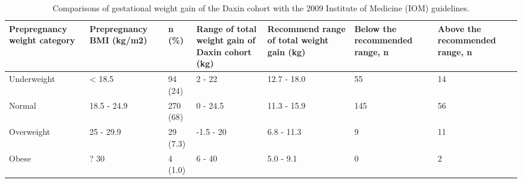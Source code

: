 \begin{table}[htp]
\tiny
\caption[Comparisons of gestational weight gain of the Daxin cohort with the 2009 Institute of Medicine (IOM) guidelines]{Comparisons of gestational weight gain of the Daxin cohort with the 2009 Institute of Medicine (IOM) guidelines.}
\begin{center}
\begin{tabular}{|p{2.1cm}|p{1.8cm}|p{1.2cm}|p{1.5cm}|p{1.6cm}|p{1.8cm}|p{1.8cm}|}
\hline
Prepregnancy weight category & Prepregnancy BMI (kg/m2) & n (\%) & Range of total weight gain of Daxin cohort (kg) & Recommend range of total weight gain (kg) & Below the recommended range, n & Above the recommended range, n  \\ \hline
Underweight & < 18.5 & 94 (24) & 2 - 22 & 12.7 - 18.0 & 55 & 14  \\ \hline
Normal & 18.5 - 24.9 & 270 (68) & 0 - 24.5 & 11.3 - 15.9 & 145 & 56  \\ \hline
Overweight & 25 - 29.9 & 29 (7.3) & -1.5 - 20 & 6.8 - 11.3 & 9 & 11  \\ \hline
Obese & ? 30 & 4 (1.0) & 6 - 40 & 5.0 - 9.1 & 0 & 2  \\ \hline
\end{tabular}
\end{center}
\label{default}
\end{table}
